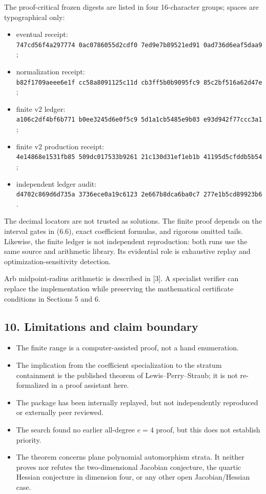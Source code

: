 \documentclass[
  11pt,
  a4paper,
]{article}
\providecommand{\tightlist}{%
  \setlength{\itemsep}{0pt}\setlength{\parskip}{0pt}}
\begin{document}
The proof-critical frozen digests are listed in four 16-character
groups; spaces are typographical only:

\begin{itemize}
\tightlist
\item
  eventual receipt:
  \texttt{747cd56f4a297774\ 0ac0786055d2cdf0\ 7ed9e7b89521ed91\ 0ad736d6eaf5daa9};
\item
  normalization receipt:
  \texttt{b82f1709aeee6e1f\ cc58a8091125c11d\ cb3ff5b0b9095fc9\ 85c2bf516a62d47e};
\item
  finite v2 ledger:
  \texttt{a106c2df4bf6b771\ b0ee3245d6e0f5c9\ 5d1a1cb5485e9b03\ e93d942f77ccc3a1};
\item
  finite v2 production receipt:
  \texttt{4e14868e1531fb85\ 509dc017533b9261\ 21c130d31ef1eb1b\ 41195d5cfddb5b54};
\item
  independent ledger audit:
  \texttt{d4702c869d6d735a\ 3736ece0a19c6123\ 2e667b8dca6ba0c7\ 277e1b5cd89923b6}.
\end{itemize}

The decimal locators are not trusted as solutions. The finite proof
depends on the interval gates in (6.6), exact coefficient formulas, and
rigorous omitted tails. Likewise, the finite ledger is not independent
reproduction: both runs use the same source and arithmetic library. Its
evidential role is exhaustive replay and optimization-sensitivity
detection.

Arb midpoint-radius arithmetic is described in {[}3{]}. A specialist
verifier can replace the implementation while preserving the
mathematical certificate conditions in Sections 5 and 6.

\subsection{10. Limitations and claim
boundary}\label{limitations-and-claim-boundary}

\begin{itemize}
\tightlist
\item
  The finite range is a computer-assisted proof, not a hand enumeration.
\item
  The implication from the coefficient specialization to the stratum
  containment is the published theorem of Lewis--Perry--Straub; it is
  not re-formalized in a proof assistant here.
\item
  The package has been internally replayed, but not independently
  reproduced or externally peer reviewed.
\item
  The search found no earlier all-degree \(e=4\) proof, but this does
  not establish priority.
\item
  The theorem concerns plane polynomial automorphism strata. It neither
  proves nor refutes the two-dimensional Jacobian conjecture, the
  quartic Hessian conjecture in dimension four, or any other open
  Jacobian/Hessian case.
\end{itemize}
\end{document}
